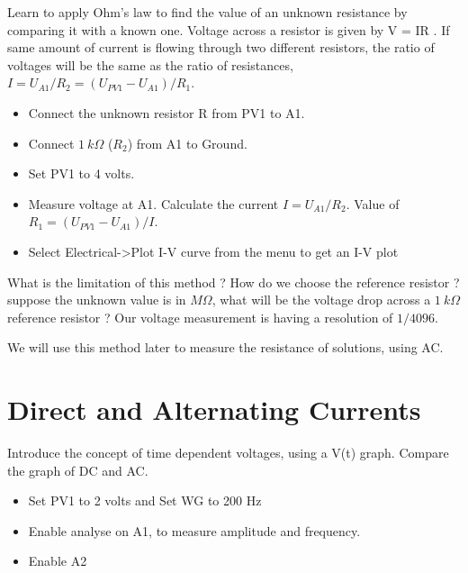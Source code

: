 \documentclass[a4paper,12pt,english]{sphinxmanual}
\let\sphinxpxdimen\pdfpxdimen\else\newdimen\sphinxpxdimen
\begin{document}
Learn to apply Ohm’s law to find the value of an unknown resistance by
comparing it with a known one. Voltage across a resistor is given by
V = IR . If same amount of current is flowing through two different
resistors, the ratio of voltages will be the same as the ratio of
resistances, \(I = U_{A1}/R_2 = (U_{PV1} - U_{A1})/R_1\).

\noindent\sphinxincludegraphics[width=300\sphinxpxdimen]{{res-compare}.pdf}

\begin{itemize}
\item {} 
Connect the unknown resistor R from PV1 to A1.

\item {} 
Connect \(1~k\Omega\) (\(R_2\)) from A1 to Ground.

\item {} 
Set PV1 to 4 volts.

\item {} 
Measure voltage at A1. Calculate the current \(I = U_{A1}/R_2\).
Value of \(R_1 = (U_{PV1} - U_{A1})/I\).

\item {} 
Select Electrical-\textgreater{}Plot I-V curve from the menu to get an I-V plot

\end{itemize}


What is the limitation of this method ? How do we choose the reference
resistor ? suppose the unknown value is in \(M\Omega\), what will be the
voltage drop across a \(1~k\Omega\) reference resistor ? Our voltage
measurement is having a resolution of \(1/4096\).

We will use this method later to measure the resistance of solutions,
using AC.


\section{Direct and Alternating Currents}
\label{\detokenize{2.9:direct-and-alternating-currents}}\label{\detokenize{2.9::doc}}

Introduce the concept of time dependent voltages, using a V(t) graph.
Compare the graph of DC and AC.

\noindent\sphinxincludegraphics[width=300\sphinxpxdimen]{{ac-dc}.pdf}

\begin{itemize}
\item {} 
Set PV1 to 2 volts and Set WG to 200 Hz

\item {} 
Enable analyse on A1, to measure amplitude and frequency.

\item {} 
Enable A2

\end{itemize}
\end{document}
